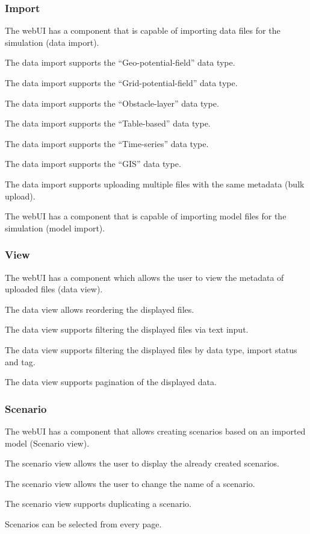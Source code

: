 \subsubsection{Import}
\reqstartF
\item The webUI has a component that is capable of importing data files for the simulation (data import).
\item The data import supports the \enquote{Geo-potential-field} data type.
\item The data import supports the \enquote{Grid-potential-field} data type.
\item The data import supports the \enquote{Obstacle-layer} data type.
\item The data import supports the \enquote{Table-based} data type.
\item The data import supports the \enquote{Time-series} data type.
\item The data import supports the \enquote{GIS} data type.
\item The data import supports uploading multiple files with the same metadata (bulk upload).
\item The webUI has a component that is capable of importing model files for the simulation (model import).
\reqendF

\subsubsection{View}
\reqstartF
\item The webUI has a component which allows the user to view the metadata of uploaded files (data view).
\item The data view allows reordering the displayed files.
\item The data view supports filtering the displayed files via text input.
\item The data view supports filtering the displayed files by data type, import status and tag.
\item The data view supports pagination of the displayed data.
\reqendF

\subsubsection{Scenario}
\reqstartF
\item The webUI has a component that allows creating scenarios based on an imported model (Scenario view).
\item The scenario view allows the user to display the already created scenarios.
\item The scenario view allows the user to change the name of a scenario.
\item The scenario view supports duplicating a scenario.
\item Scenarios can be selected from every page.
\reqendF

